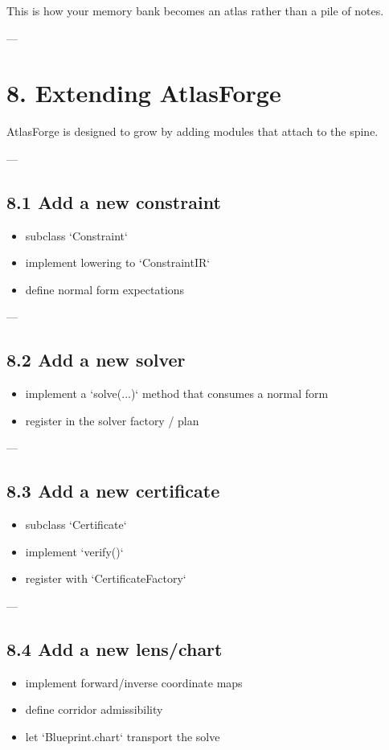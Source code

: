 \documentclass[11pt]{article}
\begin{document}
This is how your memory bank becomes an atlas rather than a pile of notes.

---

\section{8. Extending AtlasForge}

AtlasForge is designed to grow by adding modules that attach to the spine.

---

\subsection{8.1 Add a new constraint}
\begin{itemize}
\item subclass `Constraint`
\item implement lowering to `ConstraintIR`
\item define normal form expectations
\end{itemize}

---

\subsection{8.2 Add a new solver}
\begin{itemize}
\item implement a `solve(...)` method that consumes a normal form
\item register in the solver factory / plan
\end{itemize}

---

\subsection{8.3 Add a new certificate}
\begin{itemize}
\item subclass `Certificate`
\item implement `verify()`
\item register with `CertificateFactory`
\end{itemize}

---

\subsection{8.4 Add a new lens/chart}
\begin{itemize}
\item implement forward/inverse coordinate maps
\item define corridor admissibility
\item let `Blueprint.chart` transport the solve
\end{itemize}
\end{document}

